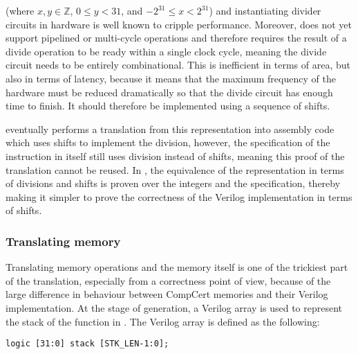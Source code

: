 (where $x, y \in \mathbb{Z}$, $0 \leq y < 31$, and $-2^{31} \leq x < 2^{31}$)
and instantiating divider circuits in hardware is well known to cripple
performance. Moreover, \vericert{} does not yet support pipelined or multi-cycle
operations and therefore requires the result of a divide operation to be ready
within a single clock cycle, meaning the divide circuit needs to be entirely
combinational. This is inefficient in terms of area, but also in terms of
latency, because it means that the maximum frequency of the hardware must be
reduced dramatically so that the divide circuit has enough time to finish.  It
should therefore be implemented using a sequence of shifts.

\compcert{} eventually performs a translation from this representation into
assembly code which uses shifts to implement the division, however, the
specification of the instruction in \rtl{} itself still uses division instead of
shifts, meaning this proof of the translation cannot be reused.  In \vericert{},
the equivalence of the representation in terms of divisions and shifts is proven
over the integers and the specification, thereby making it simpler to prove the
correctness of the Verilog implementation in terms of shifts.

\subsubsection{Translating memory}
\label{sec:hg:translating-memory}

Translating memory operations and the memory itself is one of the trickiest part
of the translation, especially from a correctness point of view, because of the
large difference in behaviour between CompCert memories and their Verilog
implementation.  At the stage of \htl{} generation, a Verilog array is used to
represent the stack of the function in \rtlsubpar{}.  The Verilog array is
defined as the following:

\begin{verbatim}
logic [31:0] stack [STK_LEN-1:0];
\end{verbatim}

